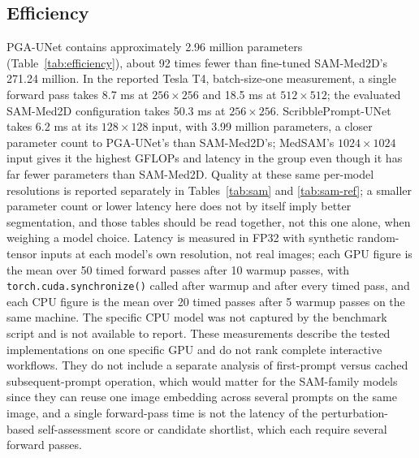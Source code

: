 \subsection{Efficiency}
\label{sec:efficiency}
PGA-UNet contains approximately 2.96 million parameters (Table~\ref{tab:efficiency}), about 92 times fewer than fine-tuned SAM-Med2D's 271.24 million. In the reported Tesla T4, batch-size-one measurement, a single forward pass takes 8.7 ms at $256\times256$ and 18.5 ms at $512\times512$; the evaluated SAM-Med2D configuration takes 50.3 ms at $256\times256$. ScribblePrompt-UNet takes 6.2 ms at its $128\times128$ input, with 3.99 million parameters, a closer parameter count to PGA-UNet's than SAM-Med2D's; MedSAM's $1024\times1024$ input gives it the highest GFLOPs and latency in the group even though it has far fewer parameters than SAM-Med2D. Quality at these same per-model resolutions is reported separately in Tables~\ref{tab:sam} and \ref{tab:sam-ref}; a smaller parameter count or lower latency here does not by itself imply better segmentation, and those tables should be read together, not this one alone, when weighing a model choice. Latency is measured in FP32 with synthetic random-tensor inputs at each model's own resolution, not real images; each GPU figure is the mean over 50 timed forward passes after 10 warmup passes, with \texttt{torch.cuda.synchronize()} called after warmup and after every timed pass, and each CPU figure is the mean over 20 timed passes after 5 warmup passes on the same machine. The specific CPU model was not captured by the benchmark script and is not available to report. These measurements describe the tested implementations on one specific GPU and do not rank complete interactive workflows. They do not include a separate analysis of first-prompt versus cached subsequent-prompt operation, which would matter for the SAM-family models since they can reuse one image embedding across several prompts on the same image, and a single forward-pass time is not the latency of the perturbation-based self-assessment score or candidate shortlist, which each require several forward passes.

\begin{table}[t]
\caption{Parameters, FLOPs, and single forward-pass latency in the tested environment (NVIDIA Tesla T4, batch size 1), one BTXRD checkpoint per model.}
\label{tab:efficiency}
\centering
\scriptsize
{}
\end{table}

